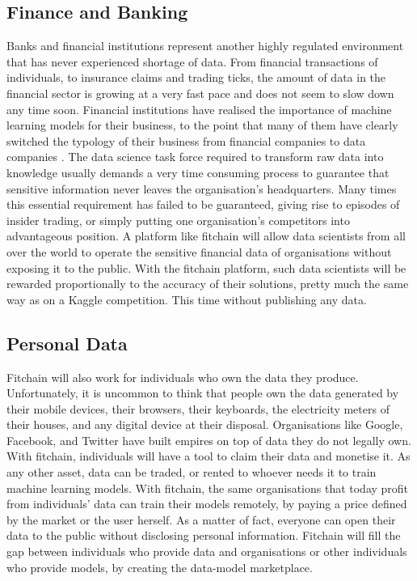\documentclass[12pt, a4paper,titlepage]{extreport}
\begin{document}
\subsection{Finance and Banking}
Banks and financial institutions represent another highly regulated environment that has never experienced shortage of data. From financial transactions of individuals, to insurance claims and trading ticks, the amount of data in the financial sector is growing at a very fast pace and does not seem to slow down any time soon. 
Financial institutions have realised the importance of machine learning models for their business, to the point that many of them have clearly switched the typology of their business from financial companies to data companies \cite{forbesdataorgs}. 
The data science task force required to transform raw data into knowledge usually demands a very time consuming process to guarantee that sensitive information never leaves the organisation's headquarters. Many times this essential requirement has failed to be guaranteed, giving rise to episodes of insider trading, or simply putting one organisation's competitors into advantageous position. 
A platform like fitchain will allow data scientists from all over the world to operate the sensitive financial data of organisations without exposing it to the public. With the fitchain platform, such data scientists will be rewarded proportionally to the accuracy of their solutions, pretty much the same way as on a Kaggle \cite{kaggle} competition. This time without publishing any data.


\subsection{Personal Data}
Fitchain will also work for individuals who own the data they produce. Unfortunately, it is uncommon to think that people own the data generated by their mobile devices, their browsers, their keyboards, the electricity meters of their houses, and any digital device at their disposal. 
Organisations like Google, Facebook, and Twitter have built empires on top of data they do not legally own.
With fitchain, individuals will have a tool to claim their data and monetise it. As any other asset, data can be traded, or rented to whoever needs it to train machine learning models. 
With fitchain, the same organisations that today profit from individuals' data can train their models remotely, by paying a price defined by the market or the user herself. As a matter of fact, everyone can open their data to the public without disclosing personal information. Fitchain will fill the gap between individuals who provide data and organisations or other individuals who provide models, by creating the data-model marketplace. 
\end{document}
